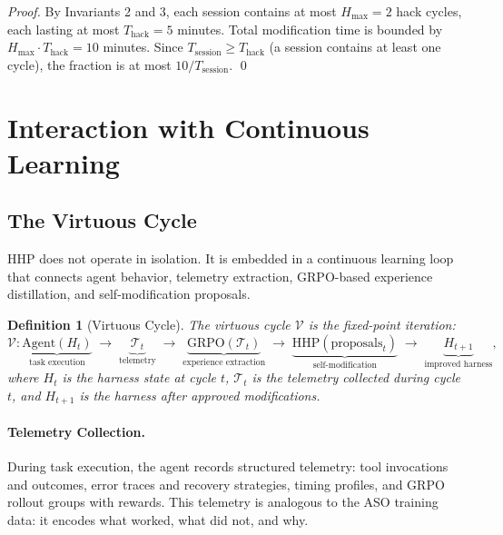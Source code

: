 \documentclass[11pt]{article}
\newtheorem{definition}{Definition}
\begin{document}
\begin{proof}
By Invariants 2 and 3, each session contains at most $H_{\max} = 2$ hack cycles,
each lasting at most $T_{\text{hack}} = 5$ minutes. Total modification time is
bounded by $H_{\max} \cdot T_{\text{hack}} = 10$ minutes. Since
$T_{\text{session}} \geq T_{\text{hack}}$ (a session contains at least one
cycle), the fraction is at most $10 / T_{\text{session}}$. \qed
\end{proof}

\section{Interaction with Continuous Learning}
\label{sec:cycle}

\subsection{The Virtuous Cycle}
\label{sec:virtuous}

HHP does not operate in isolation. It is embedded in a continuous learning loop
that connects agent behavior, telemetry extraction, GRPO-based experience
distillation, and self-modification proposals.

\begin{definition}[Virtuous Cycle]
The \emph{virtuous cycle} $\mathcal{V}$ is the fixed-point iteration:
\begin{equation}
    \mathcal{V}: \underbrace{\text{Agent}(H_t)}_{\text{task execution}}
    \;\to\; \underbrace{\mathcal{T}_t}_{\text{telemetry}}
    \;\to\; \underbrace{\text{GRPO}(\mathcal{T}_t)}_{\text{experience extraction}}
    \;\to\; \underbrace{\text{HHP}(\text{proposals}_t)}_{\text{self-modification}}
    \;\to\; \underbrace{H_{t+1}}_{\text{improved harness}},
\end{equation}
where $H_t$ is the harness state at cycle $t$, $\mathcal{T}_t$ is the telemetry
collected during cycle $t$, and $H_{t+1}$ is the harness after approved
modifications.
\end{definition}

\paragraph{Telemetry Collection.}
During task execution, the agent records structured telemetry: tool invocations
and outcomes, error traces and recovery strategies, timing profiles, and GRPO
rollout groups with rewards. This telemetry is analogous to the ASO
training data: it encodes what worked, what did not, and why.
\end{document}
